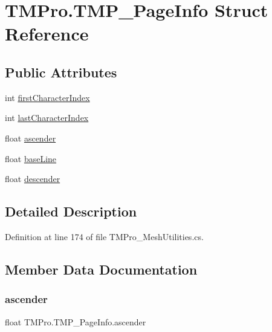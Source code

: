 \hypertarget{struct_t_m_pro_1_1_t_m_p___page_info}{}\section{T\+M\+Pro.\+T\+M\+P\+\_\+\+Page\+Info Struct Reference}
\label{struct_t_m_pro_1_1_t_m_p___page_info}
\subsection*{Public Attributes}
\begin{DoxyCompactItemize}
\item 
int \mbox{\hyperlink{struct_t_m_pro_1_1_t_m_p___page_info_adddffb34b73d0e134c2ba3766d16a460}{first\+Character\+Index}}
\item 
int \mbox{\hyperlink{struct_t_m_pro_1_1_t_m_p___page_info_a0ab5f215ebd4e0c52a8ec466ff311faa}{last\+Character\+Index}}
\item 
float \mbox{\hyperlink{struct_t_m_pro_1_1_t_m_p___page_info_a256ceb8a51ffd08e7087e66957b91634}{ascender}}
\item 
float \mbox{\hyperlink{struct_t_m_pro_1_1_t_m_p___page_info_ae722ae02114463ca865f526673fb6af9}{base\+Line}}
\item 
float \mbox{\hyperlink{struct_t_m_pro_1_1_t_m_p___page_info_a3de6a8e380aa8e048b542bc1c0691d66}{descender}}
\end{DoxyCompactItemize}


\subsection{Detailed Description}


Definition at line 174 of file T\+M\+Pro\+\_\+\+Mesh\+Utilities.\+cs.



\subsection{Member Data Documentation}
\mbox{\label{struct_t_m_pro_1_1_t_m_p___page_info_a256ceb8a51ffd08e7087e66957b91634}} 
\subsubsection{\texorpdfstring{ascender}{ascender}}
{\footnotesize\ttfamily float T\+M\+Pro.\+T\+M\+P\+\_\+\+Page\+Info.\+ascender}



